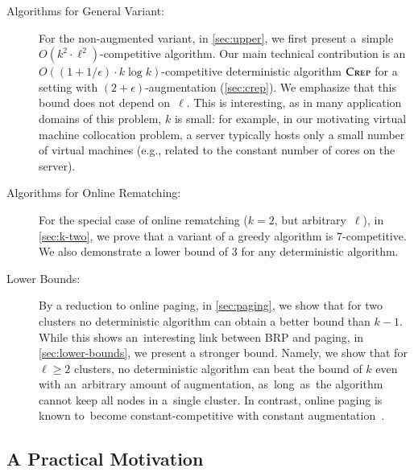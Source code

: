 \documentclass[11pt,a4paper]{scrartcl}
\newcommand{\CREP}{\textsc{Crep}\xspace}
\newcommand{\eps}{\ensuremath{\epsilon}}
\begin{document}
\begin{description}

\item[Algorithms for General Variant:]
For the non-augmented variant, in \cref{sec:upper}, we first present a~simple
$O(k^2 \cdot \ell^2)$-competitive algorithm. Our main technical contribution
is an $O((1+1/\eps) \cdot k \log{k})$-competitive deterministic algorithm
$\CREP$ for a setting with $(2+\eps)$-augmentation (\cref{sec:crep}).
We emphasize that this bound does not depend on~$\ell$. This is interesting,
as in many application domains of this problem, $k$ is small: for example, in
our motivating virtual machine collocation problem, a server typically hosts
only a small number of virtual machines (e.g., related to the constant number
of cores on the server).

\item[Algorithms for Online Rematching:]
For the special case of online rematching ($k=2$, but arbitrary~$\ell$), in
\cref{sec:k-two}, we prove that a variant of a greedy algorithm is
7-competitive. We also demonstrate a lower bound of 3 for any deterministic
algorithm.

\item[Lower Bounds:]
By a reduction to online paging, in \cref{sec:paging}, we show that
for two clusters no deterministic algorithm can obtain a better bound than
$k-1$. While this shows an~interesting link between BRP and paging, in
\cref{sec:lower-bounds}, we present a stronger bound. Namely, we
show that for $\ell \geq 2$ clusters, no deterministic algorithm can beat the
bound of $k$ even with an~arbitrary amount of augmentation, as~long~as~the
algorithm cannot keep all nodes in a~single cluster. In contrast, online
paging is known to~become constant-competitive with constant
augmentation~\cite{SleTar85}.

\end{description}


\subsection{A Practical Motivation}
\end{document}
